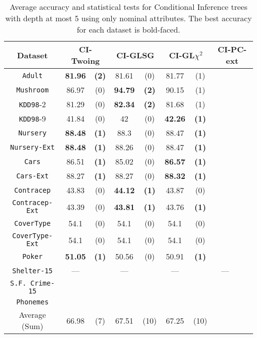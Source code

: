 \begin{table*}
\small
\centering
    \caption{Average accuracy and statistical tests  for  Conditional Inference trees 
with depth at most 5 using only nominal attributes. The best accuracy for each dataset is bold-faced.}
\label{tab:CrossValCTree}
\begin{tabular}{c|cc|cc|cc|cc} 
Dataset &   \multicolumn{2}{c|}{CI-Twoing} &   \multicolumn{2}{c|}{CI-GLSG} & \multicolumn{2}{c|}{CI-GL$\chi^2$}& \multicolumn{2}{c}{CI-PC-ext} \\  \hline   
{\tt Adult}         &{\bf 81.96} &{\bf  (2)} & 81.61 & (0) & 81.77 & (1) & & \\
{\tt Mushroom}         &86.97 & (0) &{\bf  94.79 }& {\bf (2)} & 90.15 & (1) & & \\
{\tt KDD98}-2         &81.29 & (0) & {\bf 82.34 }& {\bf (2) }& 81.68 & (1) & & \\
{\tt KDD98}-9         &41.84 & (0) & 42    & (0) & {\bf 42.26} & {\bf (1)} & & \\
{\tt Nursery}         &{\bf 88.48} & {\bf (1)} & 88.3  & (0) & 88.47 & {\bf (1)} & & \\
{\tt Nursery-Ext}         &{\bf 88.48} & {\bf (1)} & 88.26 & (0) & 88.47 & {\bf (1)}& &  \\
{\tt Cars}         &86.51 & {\bf (1)} & 85.02 & (0) & {\bf 86.57} & {\bf (1)}& &  \\
{\tt Cars-Ext}         &88.27 & {\bf (1) }& 88.27& (0) & {\bf 88.32} & {\bf (1)} & & \\
{\tt Contracep}         &43.83 & (0) & {\bf 44.12} & {\bf (1)} & 43.87 & (0) & & \\
{\tt Contracep-Ext}         &43.39 & (0) & {\bf 43.81} & {\bf (1)} & 43.76 & {\bf (1)} & & \\
{\tt CoverType}         &54.1  & (0) & 54.1  & (0) & 54.1  & (0) & & \\
{\tt CoverType-Ext}         &54.1  & (0) & 54.1  & (0) & 54.1  & (0) & & \\
{\tt Poker}         &{\bf 51.05} & {\bf (1)} & 50.56 & (0) & 50.91 & {\bf (1)} & & \\  
{\tt Shelter-15}   & ---   &   & --- &   &  --- &    & --- &      \\   
{\tt S.F. Crime-15} &  &  & &  & & & &      \\ 
{\tt Phonemes}      &  &  & &  & & & &     \\ 
\hline
Average (Sum)         &66.98 & (7)  &  67.51 & (10)  & 67.25 &  (10) & & 
       \end{tabular}
\end{table*}


